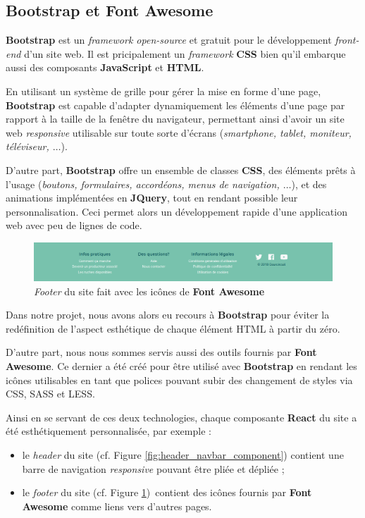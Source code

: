\documentclass[a4paper,12pt]{report}
\theoremstyle{break}
\theoremstyle{break}
\theoremstyle{break}
\theoremstyle{break}
\theoremstyle{definition}
\theoremstyle{remark}
\begin{document}
\subsection{Bootstrap et Font Awesome}
\textbf{Bootstrap} est un \textit{framework open-source} et gratuit pour le développement \textit{front-end} d'un site web. Il est pricipalement un \textit{framework} \textbf{CSS} bien qu'il embarque aussi des composants \textbf{JavaScript} et \textbf{HTML}.

En utilisant un système de grille pour gérer la mise en forme d'une page, \textbf{Bootstrap} est capable d'adapter dynamiquement les éléments d'une page par rapport à la taille de la fenêtre du navigateur, permettant ainsi d'avoir un site web \textit{responsive} utilisable sur toute sorte d'écrans (\textit{smartphone, tablet, moniteur, téléviseur, $\dots$}).

D'autre part, \textbf{Bootstrap} offre un ensemble de classes \textbf{CSS}, des éléments prêts à l'usage (\textit{boutons, formulaires, accordéons, menus de navigation, $\dots$}), et des animations implémentées en \textbf{JQuery}, tout en rendant possible leur personnalisation. Ceci permet alors un développement rapide d'une application web avec peu de lignes de code.

\begin{figure}[!ht]
  \centering
  \includegraphics[scale=0.35]{images/footer.png}
  \caption{\textit{Footer} du site fait avec les icônes de \textbf{Font Awesome}}
  \label{fig:footer_font_awesome}
\end{figure}

Dans notre projet, nous avons alors eu recours à \textbf{Bootstrap} pour éviter la redéfinition de l'aspect esthétique de chaque élément HTML à partir du zéro.

D'autre part, nous nous sommes servis aussi des outils fournis par \textbf{Font Awesome}. Ce dernier a été créé pour être utilisé avec \textbf{Bootstrap} en rendant les icônes utilisables en tant que polices pouvant subir des changement de styles via CSS, SASS et LESS.

Ainsi en se servant de ces deux technologies, chaque composante \textbf{React} du site a été esthétiquement personnalisée, par exemple :
\begin{itemize}
  \item le \textit{header} du site (cf. Figure \ref{fig:header_navbar_component}) contient une barre de navigation \textit{responsive} pouvant être pliée et dépliée ;
  \item le \textit{footer} du site (cf. Figure \ref{fig:footer_font_awesome}) contient des icônes fournis par \textbf{Font Awesome} comme liens vers d'autres pages.
\end{itemize}
\end{document}
